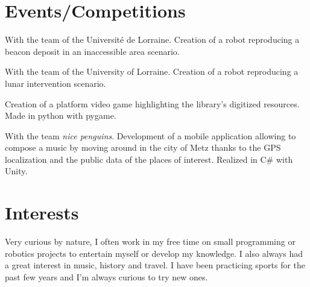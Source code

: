 \documentclass[letterpaper]{twentysecondcv - EN} %
\begin{document}

\section{Events/Competitions}

\begin{twenty}
	
	{
		With the team of the Université de Lorraine. Creation of a robot reproducing a beacon deposit in an inaccessible area scenario.
	}
	
	{
		With the team of the University of Lorraine. Creation of a robot reproducing a lunar intervention scenario.
	}
	
	
	{
		Creation of a platform video game highlighting the library's digitized resources. Made in python with pygame.
	}
	
	{
		With the team \textit{nice penguins}. Development of a mobile application allowing to compose a music by moving around in the city of Metz thanks to the GPS localization and the public data of the places of interest. Realized in C\# with Unity.
	}
	
\end{twenty}



\section{Interests}
Very curious by nature, I often work in my free time on small programming or robotics projects to entertain myself or develop my knowledge. I also always had a great interest in music, history and travel. I have been practicing sports for the past few years and I'm always curious to try new ones.
\end{document}
